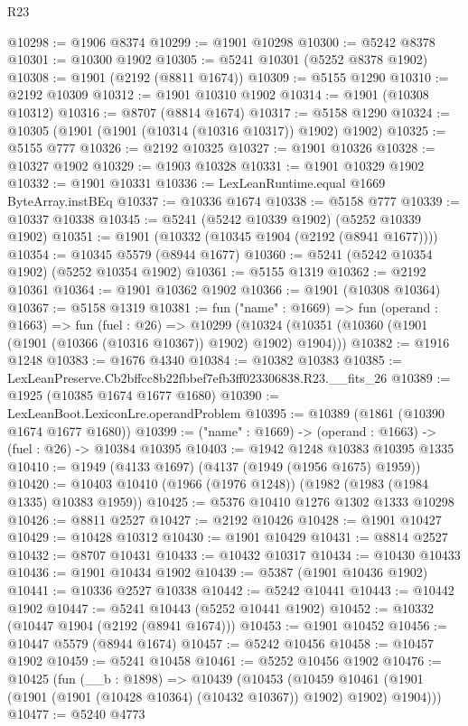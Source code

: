 \begin{lexlean}{R23}
\begin{coremodule}
@10298 := @1906 @8374
@10299 := @1901 @10298
@10300 := @5242 @8378
@10301 := @10300 @1902
@10305 := @5241 @10301 (@5252 @8378 @1902)
@10308 := @1901 (@2192 (@8811 @1674))
@10309 := @5155 @1290
@10310 := @2192 @10309
@10312 := @1901 @10310 @1902
@10314 := @1901 (@10308 @10312)
@10316 := @8707 (@8814 @1674)
@10317 := @5158 @1290
@10324 := @10305 (@1901 (@1901 (@10314 (@10316 @10317)) @1902) @1902)
@10325 := @5155 @777
@10326 := @2192 @10325
@10327 := @1901 @10326
@10328 := @10327 @1902
@10329 := @1903 @10328
@10331 := @1901 @10329 @1902
@10332 := @1901 @10331
@10336 := LexLeanRuntime.equal @1669 ByteArray.instBEq
@10337 := @10336 @1674
@10338 := @5158 @777
@10339 := @10337 @10338
@10345 := @5241 (@5242 @10339 @1902) (@5252 @10339 @1902)
@10351 := @1901 (@10332 (@10345 @1904 (@2192 (@8941 @1677))))
@10354 := @10345 @5579 (@8944 @1677)
@10360 := @5241 (@5242 @10354 @1902) (@5252 @10354 @1902)
@10361 := @5155 @1319
@10362 := @2192 @10361
@10364 := @1901 @10362 @1902
@10366 := @1901 (@10308 @10364)
@10367 := @5158 @1319
@10381 := fun ("name" : @1669) =>
  fun (operand : @1663) =>
  fun (fuel : @26) =>
  @10299 (@10324 (@10351 (@10360 (@1901 (@1901 (@10366 (@10316 @10367)) @1902) @1902) @1904)))
@10382 := @1916 @1248
@10383 := @1676 @4340
@10384 := @10382 @10383
@10385 := LexLeanPreserve.Cb2bffcc8b22fbbef7efb3ff023306838.R23.__fits_26
@10389 := @1925 (@10385 @1674 @1677 @1680)
@10390 := LexLeanBoot.LexiconLre.operandProblem
@10395 := @10389 (@1861 (@10390 @1674 @1677 @1680))
@10399 := ("name" : @1669) -> (operand : @1663) -> (fuel : @26) -> @10384 @10395
@10403 := @1942 @1248 @10383 @10395 @1335
@10410 := @1949 (@4133 @1697) (@4137 (@1949 (@1956 @1675) @1959))
@10420 := @10403 @10410 (@1966 (@1976 @1248)) (@1982 (@1983 (@1984 @1335) @10383 @1959))
@10425 := @5376 @10410 @1276 @1302 @1333 @10298
@10426 := @8811 @2527
@10427 := @2192 @10426
@10428 := @1901 @10427
@10429 := @10428 @10312
@10430 := @1901 @10429
@10431 := @8814 @2527
@10432 := @8707 @10431
@10433 := @10432 @10317
@10434 := @10430 @10433
@10436 := @1901 @10434 @1902
@10439 := @5387 (@1901 @10436 @1902)
@10441 := @10336 @2527 @10338
@10442 := @5242 @10441
@10443 := @10442 @1902
@10447 := @5241 @10443 (@5252 @10441 @1902)
@10452 := @10332 (@10447 @1904 (@2192 (@8941 @1674)))
@10453 := @1901 @10452
@10456 := @10447 @5579 (@8944 @1674)
@10457 := @5242 @10456
@10458 := @10457 @1902
@10459 := @5241 @10458
@10461 := @5252 @10456 @1902
@10476 := @10425
    (fun (__b : @1898) =>
    @10439
      (@10453
        (@10459 @10461 (@1901 (@1901 (@1901 (@10428 @10364) (@10432 @10367)) @1902) @1902) @1904)))
@10477 := @5240 @4773

\end{coremodule}
\end{lexlean}
